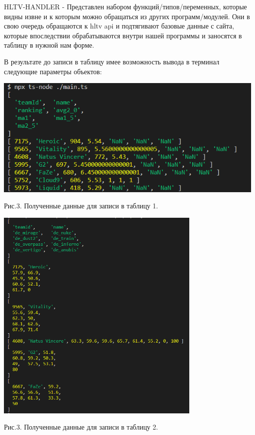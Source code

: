 \documentclass[utf8,14pt,a4paper,oneside,russian]{book}
\begin{document}
        HLTV-HANDLER - Представлен набором функций/типов/переменных, которые видны извне и к которым можно обращаться из других программ/модулей. Они в свою очередь обращаются к hltv api и подтягивают базовые данные с сайта, которые впоследствии обрабатываются внутри нашей программы и заносятся в таблицу в нужной нам форме.

        В результате до записи в таблицу имее возможность вывода 
        в терминал следующие параметры объектов:
        
        \includegraphics[width=15cm]{term1}
        \begin{center}
          Рис.3. Полученные данные для записи в таблицу 1.
        \end{center}

        \includegraphics[width=10cm]{term2}
        \begin{center}
          Рис.3. Полученные данные для записи в таблицу 2.
        \end{center}
\end{document}

